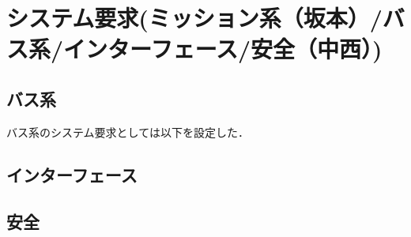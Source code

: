 \section{システム要求(ミッション系（坂本）/バス系/インターフェース/安全（中西）)}

\subsection{バス系}
バス系のシステム要求としては以下を設定した．

\subsection{インターフェース}

\subsection{安全}
